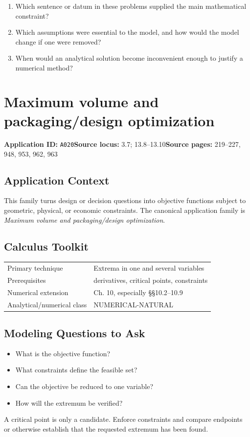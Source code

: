 \documentclass[11pt]{book}
\newcommand{\pid}[1]{\texttt{#1}}
\begin{document}
\begin{reflectionbox}\begin{enumerate}
\item Which sentence or datum in these problems supplied the main mathematical constraint?
\item Which assumptions were essential to the model, and how would the model change if one were removed?
\item When would an analytical solution become inconvenient enough to justify a numerical method?
\end{enumerate}\end{reflectionbox}
\chapter{Maximum volume and packaging/design optimization}\label{app:A020}
\textbf{Application ID:} \pid{A020}\quad \textbf{Source locus:} 3.7; 13.8–13.10\quad \textbf{Source pages:} 219–227, 948, 953, 962, 963
\section*{Application Context}
This family turns design or decision questions into objective functions subject to geometric, physical, or economic constraints. The canonical application family is \emph{Maximum volume and packaging/design optimization}.
\section*{Calculus Toolkit}
\begin{tabularx}{\textwidth}{@{}lX@{}}\toprule
Primary technique & Extrema in one and several variables \\
Prerequisites & derivatives, critical points, constraints \\
Numerical extension & Ch. 10, especially §§10.2–10.9 \\
Analytical/numerical class & NUMERICAL-NATURAL \\
\bottomrule\end{tabularx}
\section*{Modeling Questions to Ask}\begin{itemize}
\item What is the objective function?
\item What constraints define the feasible set?
\item Can the objective be reduced to one variable?
\item How will the extremum be verified?
\end{itemize}
\begin{errorbox}A critical point is only a candidate. Enforce constraints and compare endpoints or otherwise establish that the requested extremum has been found.\end{errorbox}
\end{document}
